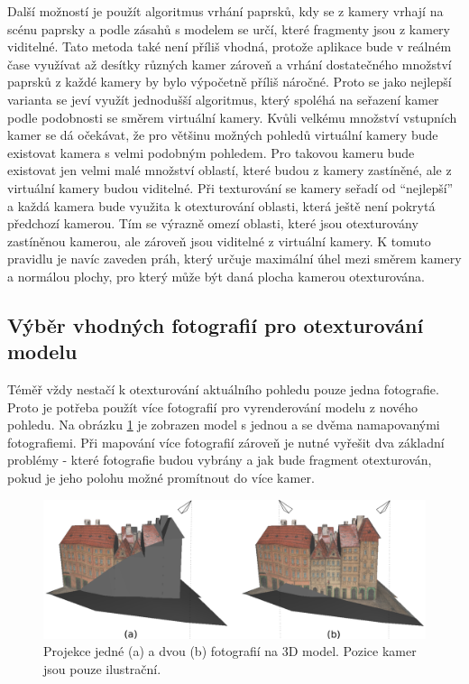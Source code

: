 \documentclass[11pt,twoside,a4paper]{book}
\begin{document}
Další možností je použít algoritmus vrhání paprsků, kdy se z kamery vrhají na scénu paprsky a podle zásahů s modelem se určí, které fragmenty jsou z kamery viditelné. Tato metoda také není příliš vhodná, protože aplikace bude v reálném čase využívat až desítky různých kamer zároveň a vrhání dostatečného množství paprsků z každé kamery by bylo výpočetně příliš náročné. Proto se jako nejlepší varianta se jeví využít jednodušší algoritmus, který spoléhá na seřazení kamer podle podobnosti se směrem virtuální kamery. Kvůli velkému množství vstupních kamer se dá očekávat, že pro většinu možných pohledů virtuální kamery bude existovat kamera s velmi podobným pohledem. Pro takovou kameru bude existovat jen velmi malé množství oblastí, které budou z kamery zastíněné, ale z virtuální kamery budou viditelné. Při texturování se kamery seřadí od ``nejlepší'' a každá kamera bude využita k otexturování oblasti, která ještě není pokrytá předchozí kamerou. Tím se výrazně omezí oblasti, které jsou otexturovány zastíněnou kamerou, ale zároveň jsou viditelné z virtuální kamery. K tomuto pravidlu je navíc zaveden práh, který určuje maximální úhel mezi směrem kamery a normálou plochy, pro který může být daná plocha kamerou otexturována. 

\newpage
\subsection{Výběr vhodných fotografií pro otexturování modelu}
\label{sec:photo-choosing}

Téměř vždy nestačí k otexturování aktuálního pohledu pouze jedna fotografie. Proto je potřeba použít více fotografií pro vyrenderování modelu z nového pohledu. Na obrázku \ref{fig:dum-1} je zobrazen model s jednou a se dvěma namapovanými fotografiemi.  Při mapování více fotografií zároveň je nutné vyřešit dva základní problémy - které fotografie budou vybrány a jak bude fragment otexturován, pokud je jeho polohu možné promítnout do více kamer.

\begin{figure}[h]
\begin{center}
\includegraphics[width=\textwidth]{figures/dum-1}
\caption{Projekce jedné (a) a dvou (b) fotografií na 3D model. Pozice kamer jsou pouze ilustrační.}
\label{fig:dum-1}
\end{center}
\end{figure}
\end{document}
